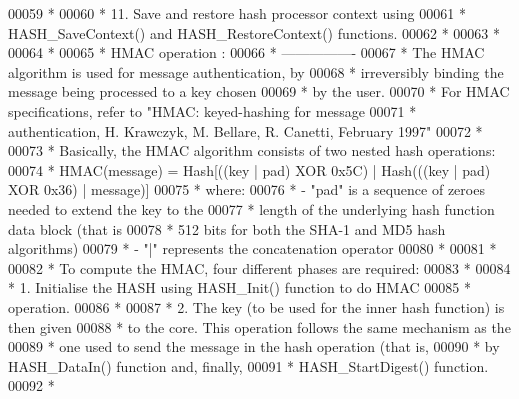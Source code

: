 \begin{DoxyCode}
00059 \textcolor{comment}{  *                     }
00060 \textcolor{comment}{  *        11. Save and restore hash processor context using }
00061 \textcolor{comment}{  *            HASH\_SaveContext() and HASH\_RestoreContext() functions.     }
00062 \textcolor{comment}{  *              }
00063 \textcolor{comment}{  *}
00064 \textcolor{comment}{  *            }
00065 \textcolor{comment}{  *          HMAC operation : }
00066 \textcolor{comment}{  *          ----------------  }
00067 \textcolor{comment}{  *          The HMAC algorithm is used for message authentication, by }
00068 \textcolor{comment}{  *          irreversibly binding the message being processed to a key chosen }
00069 \textcolor{comment}{  *          by the user. }
00070 \textcolor{comment}{  *          For HMAC specifications, refer to "HMAC: keyed-hashing for message }
00071 \textcolor{comment}{  *          authentication, H. Krawczyk, M. Bellare, R. Canetti, February 1997"}
00072 \textcolor{comment}{  *          }
00073 \textcolor{comment}{  *          Basically, the HMAC algorithm consists of two nested hash operations:}
00074 \textcolor{comment}{  *          HMAC(message) = Hash[((key | pad) XOR 0x5C) | Hash(((key | pad) XOR 0x36) | message)]}
00075 \textcolor{comment}{  *          where:}
00076 \textcolor{comment}{  *          - "pad" is a sequence of zeroes needed to extend the key to the }
00077 \textcolor{comment}{  *                  length of the underlying hash function data block (that is }
00078 \textcolor{comment}{  *                  512 bits for both the SHA-1 and MD5 hash algorithms)}
00079 \textcolor{comment}{  *          - "|"   represents the concatenation operator }
00080 \textcolor{comment}{  *          }
00081 \textcolor{comment}{  *         }
00082 \textcolor{comment}{  *         To compute the HMAC, four different phases are required:}
00083 \textcolor{comment}{  *                    }
00084 \textcolor{comment}{  *         1.  Initialise the HASH using HASH\_Init() function to do HMAC }
00085 \textcolor{comment}{  *             operation. }
00086 \textcolor{comment}{  *                }
00087 \textcolor{comment}{  *         2.  The key (to be used for the inner hash function) is then given }
00088 \textcolor{comment}{  *             to the core. This operation follows the same mechanism as the }
00089 \textcolor{comment}{  *             one used to send the message in the hash operation (that is, }
00090 \textcolor{comment}{  *             by HASH\_DataIn() function and, finally, }
00091 \textcolor{comment}{  *             HASH\_StartDigest() function.}
00092 \textcolor{comment}{  *          }

\end{DoxyCode}
